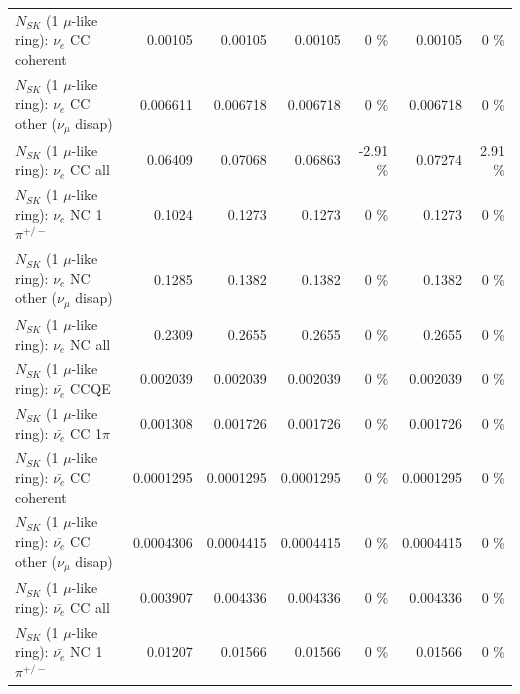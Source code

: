 \begin{table}
\begin{tabular}{| l | r | r | r  r | r  r |}
                               $N_{SK}$ (1 $\mu$-like ring): $\nu_e$ CC coherent &         0.00105 &         0.00105 &         0.00105 &        0 \%  &         0.00105 &        0 \%  \\ 
                $N_{SK}$ (1 $\mu$-like ring): $\nu_e$ CC other ($\nu_\mu$ disap) &        0.006611 &        0.006718 &        0.006718 &        0 \%  &        0.006718 &        0 \%  \\ 
                                  $N_{SK}$ (1 $\mu$-like ring): $\nu_{e}$ CC all &         0.06409 &         0.07068 &         0.06863 &    -2.91 \%  &         0.07274 &     2.91 \%  \\ 
\hline
                           $N_{SK}$ (1 $\mu$-like ring): $\nu_e$ NC 1$\pi^{+/-}$ &          0.1024 &          0.1273 &          0.1273 &        0 \%  &          0.1273 &        0 \%  \\ 
                $N_{SK}$ (1 $\mu$-like ring): $\nu_e$ NC other ($\nu_\mu$ disap) &          0.1285 &          0.1382 &          0.1382 &        0 \%  &          0.1382 &        0 \%  \\ 
                                  $N_{SK}$ (1 $\mu$-like ring): $\nu_{e}$ NC all &          0.2309 &          0.2655 &          0.2655 &        0 \%  &          0.2655 &        0 \%  \\ 
\hline
\hline
\hline
                                $N_{SK}$ (1 $\mu$-like ring): $\bar{\nu_e}$ CCQE &        0.002039 &        0.002039 &        0.002039 &        0 \%  &        0.002039 &        0 \%  \\ 
                           $N_{SK}$ (1 $\mu$-like ring): $\bar{\nu_e}$ CC 1$\pi$ &        0.001308 &        0.001726 &        0.001726 &        0 \%  &        0.001726 &        0 \%  \\ 
                         $N_{SK}$ (1 $\mu$-like ring): $\bar{\nu_e}$ CC coherent &       0.0001295 &       0.0001295 &       0.0001295 &        0 \%  &       0.0001295 &        0 \%  \\ 
          $N_{SK}$ (1 $\mu$-like ring): $\bar{\nu_e}$ CC other ($\nu_\mu$ disap) &       0.0004306 &       0.0004415 &       0.0004415 &        0 \%  &       0.0004415 &        0 \%  \\ 
                            $N_{SK}$ (1 $\mu$-like ring): $\bar{\nu_{e}}$ CC all &        0.003907 &        0.004336 &        0.004336 &        0 \%  &        0.004336 &        0 \%  \\ 
\hline
                     $N_{SK}$ (1 $\mu$-like ring): $\bar{\nu_e}$ NC 1$\pi^{+/-}$ &         0.01207 &         0.01566 &         0.01566 &        0 \%  &         0.01566 &        0 \%  \\ 

\end{tabular}
\end{table}
